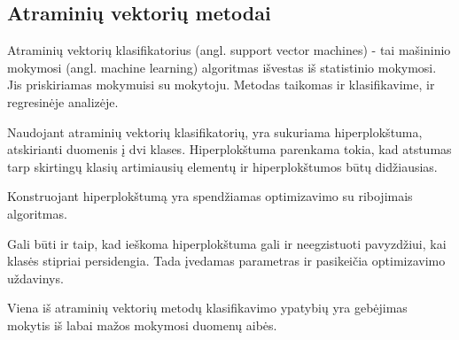 \subsection{Atraminių vektorių metodai}

Atraminių vektorių klasifikatorius\cite{vapnik2000nature} (angl. support vector
machines) - tai mašininio mokymosi (angl. machine learning) algoritmas išvestas iš
statistinio mokymosi. Jis priskiriamas mokymuisi su mokytoju. Metodas taikomas
ir klasifikavime, ir regresinėje analizėje.


Naudojant atraminių vektorių klasifikatorių, yra sukuriama hiperplokštuma,
atskirianti duomenis į dvi klases. Hiperplokštuma parenkama tokia, kad atstumas
tarp skirtingų klasių artimiausių elementų ir hiperplokštumos būtų didžiausias.

Konstruojant hiperplokštumą yra spendžiamas optimizavimo su ribojimais
algoritmas.


Gali būti ir taip, kad ieškoma hiperplokštuma gali ir neegzistuoti pavyzdžiui,
kai klasės stipriai persidengia. Tada įvedamas parametras ir pasikeičia
optimizavimo uždavinys. %




Viena iš atraminių vektorių metodų klasifikavimo ypatybių yra gebėjimas mokytis
iš labai mažos mokymosi duomenų aibės.


